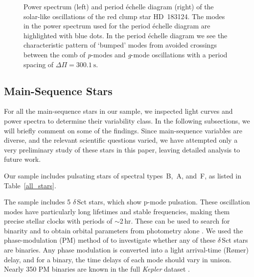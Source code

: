 \documentclass[modern]{aastex62}
\begin{document}
\begin{figure*}
\caption{\label{HD_183124}
Power spectrum (left) and period \'{e}chelle diagram (right) of the solar-like oscillations of the red clump star HD~183124. The modes in the power spectrum used for the period \'{e}chelle diagram are highlighted with blue dots. In the period \'{e}chelle diagram we see the characteristic pattern of `bumped' modes from avoided crossings between the comb of \textit{p}-modes and \textit{g}-mode oscillations with a period spacing of $\Delta \Pi = 300.1~\text{s}$.}
\end{figure*}


\subsection{Main-Sequence Stars}
\label{mainseq}

For all the main-sequence stars in our sample, we inspected light curves and power spectra to determine their variability class. In the following subsections, we will briefly comment on some of the findings. Since main-sequence variables are diverse, and the relevant scientific questions varied, we have attempted only a very preliminary study of these stars in this paper, leaving detailed analysis to future work.

Our sample includes pulsating stars of spectral types~B,~A, and~F, as listed in Table~\ref{all_stars}. 

The sample includes 5 $\delta$\,Sct stars, which show p-mode pulsation. These oscillation modes have particularly long lifetimes and stable frequencies, making them precise stellar clocks with periods of $\sim$2\,hr. These can be used to search for binarity and to obtain orbital parameters from photometry alone \citep{shibahashi&kurtz2012}. We used the phase-modulation (PM) method of \citet{murphyetal2014} to investigate whether any of these $\delta$\,Sct stars are binaries. Any phase modulation is converted into a light arrival-time (R\o mer) delay, and for a binary, the time delays of each mode should vary in unison. Nearly 350 PM binaries are known in the full \textit{Kepler} dataset \citep{murphyetal2018}.
\end{document}
